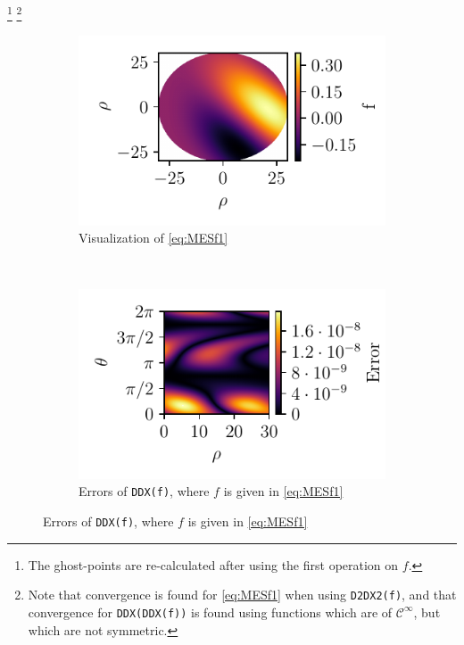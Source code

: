 %
\footnote{The ghost-points are re-calculated after using the first operation on $f$.}
\footnote{Note that convergence is found for \cref{eq:MESf1} when using \texttt{D2DX2(f)}, and that convergence for \texttt{DDX(DDX(f))} is found using functions which are of $\mathcal{C}^\infty$, but which are not symmetric.\label{foot:DDXDDX}}
%
\begin{figure}[t!]
    \centering
    \begin{subfigure}[t]{0.5\textwidth}
        \centering
        \includegraphics[width=1.0\textwidth]{fig/f}
        \caption{Visualization of \cref{eq:MESf1}}
        \label{fig:typicalMES}
    \end{subfigure}%
    ~
    \begin{subfigure}[t]{0.5\textwidth}
        \centering
        \includegraphics[width=1.0\textwidth]{fig/err}
        \caption{Errors of \texttt{DDX(f)}, where $f$ is given in \cref{eq:MESf1}}
        \label{fig:errorsMES}
    \end{subfigure}

\end{figure}
